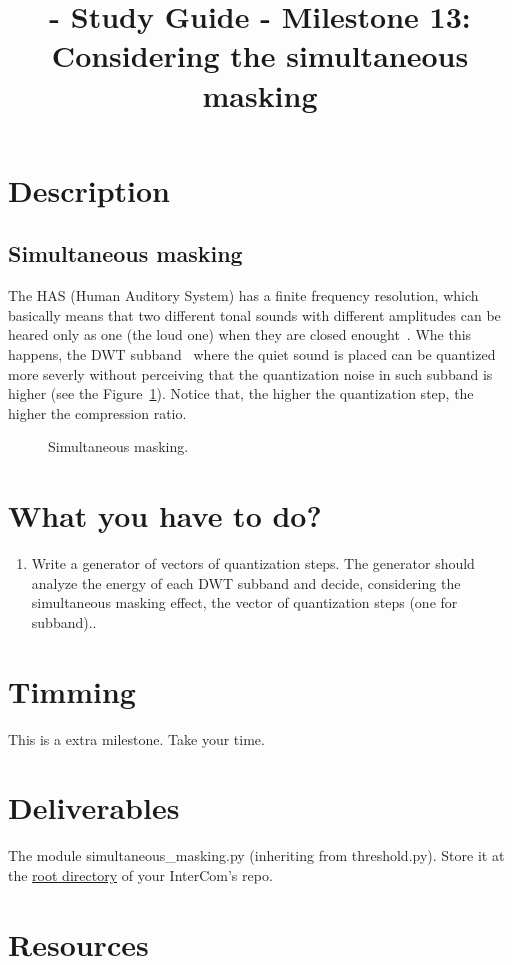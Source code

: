 
\title{\TM{} - Study Guide - Milestone 13: Considering the simultaneous masking}

\maketitle

\section{Description}

\subsection{Simultaneous masking}
The HAS (Human Auditory System) has a finite frequency resolution,
which basically means that two different tonal sounds with different
amplitudes can be heared only as one (the loud one) when they are
closed enought~\cite{bosi2003intro}. Whe this happens, the DWT
subband~\cite{vetterli1995wavelets} where the quiet sound is placed
can be quantized more severly without perceiving that the quantization
noise in such subband is higher (see the Figure~\ref{fig:SM}). Notice
that, the higher the quantization step, the higher the compression
ratio.

\begin{figure}
  \centering
  \caption{Simultaneous masking.}
  \label{fig:SM}
\end{figure}


\section{What you have to do?}

\begin{enumerate}
\item Write a generator of vectors of quantization steps. The
  generator should analyze the energy of each DWT subband and decide,
  considering the simultaneous masking effect, the vector of
  quantization steps (one for subband)..
\end{enumerate}

\section{Timming}

This is a extra milestone. Take your time.

\section{Deliverables}

The module simultaneous_masking.py (inheriting from threshold.py). Store it at the
\href{https://github.com/Tecnologias-multimedia/intercom}{root
  directory} of your InterCom's repo.

\section{Resources}



